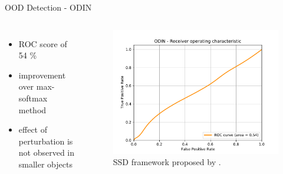 \documentclass[10pt, aspectratio=169]{beamer}
\begin{document}
\begin{frame}[allowframebreaks]{OOD Detection - ODIN}
        \begin{columns}
                \begin{itemize}
                    \item ROC score of 54 \%
                    \item improvement over max-softmax method 
                    \item effect of perturbation is not observed in smaller objects
                \end{itemize}
                \begin{figure}[!ht]
                    \centering
                    \includegraphics[scale=0.45]{images/BDD100K vs IDD_ODIN_ROC.pdf}
                    \caption[SSD framework]{SSD framework proposed by \citet[p. 24]{Liu2016SSDSS}.}
                \end{figure}
        \end{columns}
\end{frame}
\end{document}
